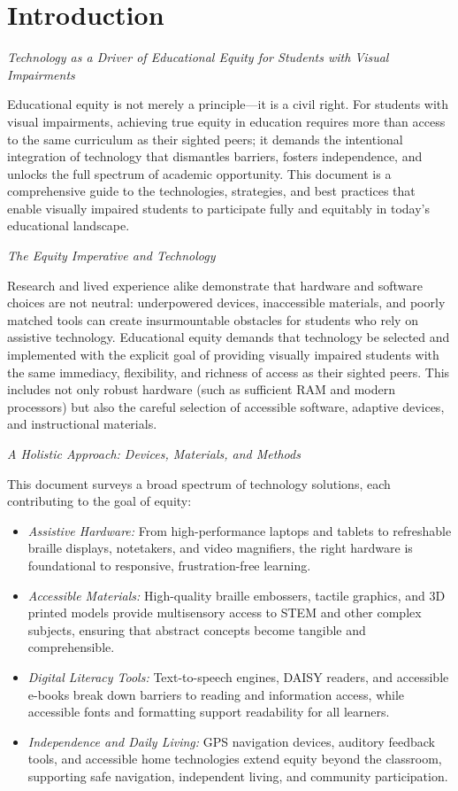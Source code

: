 \chapter*{Introduction}\label{intro}

\emph{Technology as a Driver of Educational Equity for Students with Visual Impairments}

Educational equity is not merely a principle—it is a civil right. For students with visual impairments, achieving true equity in education requires more than access to the same curriculum as their sighted peers; it demands the intentional integration of technology that dismantles barriers, fosters independence, and unlocks the full spectrum of academic opportunity. This document is a comprehensive guide to the technologies, strategies, and best practices that enable visually impaired students to participate fully and equitably in today’s educational landscape.

\emph{The Equity Imperative and Technology}

Research and lived experience alike demonstrate that hardware and software choices are not neutral: underpowered devices, inaccessible materials, and poorly matched tools can create insurmountable obstacles for students who rely on assistive technology. Educational equity demands that technology be selected and implemented with the explicit goal of providing visually impaired students with the same immediacy, flexibility, and richness of access as their sighted peers. This includes not only robust hardware (such as sufficient RAM and modern processors) but also the careful selection of accessible software, adaptive devices, and instructional materials.

\emph{A Holistic Approach: Devices, Materials, and Methods}

This document surveys a broad spectrum of technology solutions, each contributing to the goal of equity:

\begin{itemize}
    \item \emph{Assistive Hardware:} From high-performance laptops and tablets to refreshable braille displays, notetakers, and video magnifiers, the right hardware is foundational to responsive, frustration-free learning.
    \item \emph{Accessible Materials:} High-quality braille embossers, tactile graphics, and 3D printed models provide multisensory access to STEM and other complex subjects, ensuring that abstract concepts become tangible and comprehensible.
    \item \emph{Digital Literacy Tools:} Text-to-speech engines, DAISY readers, and accessible e-books break down barriers to reading and information access, while accessible fonts and formatting support readability for all learners.
    \item \emph{Independence and Daily Living:} GPS navigation devices, auditory feedback tools, and accessible home technologies extend equity beyond the classroom, supporting safe navigation, independent living, and community participation.
\end{itemize}

